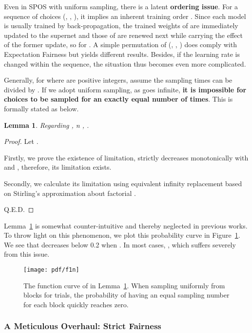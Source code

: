\documentclass[10pt,twocolumn,letterpaper]{article}
\newtheorem{lemma}[theorem]{Lemma}
\theoremstyle{definition}
\begin{document}
Even in SPOS \cite{guo2019single} with uniform sampling, there is a latent \textbf{ordering issue}. For a sequence of choices (, , ), it implies an inherent training order . Since each model is usually trained by back-propagation,
the trained weights of  are immediately updated to the supernet and those of  are renewed next while carrying the effect of the former update, so for . A simple permutation of (, , ) does comply with Expectation Fairness but yields different results. Besides, if the learning rate  is changed within the sequence, the situation thus becomes even more complicated. 

Generally, for  where  are positive integers,  
assume the sampling times  can be divided by . If we adopt uniform sampling, as  goes infinite, \textbf{it is impossible for  choices to be sampled for an exactly equal number of times}. This is formally stated as below.

\begin{lemma}
	\label{lem:m}
	Regarding ,  n  , .
\end{lemma}
\begin{proof}
Let .

	
	Firstly, we prove the existence of limitation,  strictly decreases monotonically with  and , therefore, its limitation exists. 
	
	Secondly, we calculate its limitation using equivalent infinity replacement based on Stirling's approximation about factorial \cite{tweddle2012james}.
	
	Q.E.D.
\end{proof}




Lemma~\ref{lem:m} is somewhat counter-intuitive and thereby neglected in previous works. To throw light on this phenomenon, we plot this probability curve in Figure~\ref{fig:f1n}. We see that  decreases below 0.2 when .  In most cases, , which suffers severely from this issue.

\begin{figure}[ht]
\centering
	\texttt{[image: pdf/f1n]}\\
\caption{The function curve of  in Lemma~\ref{lem:m}. When sampling uniformly from  blocks for  trials, the probability of having an equal sampling number for each block quickly reaches zero. }
	\label{fig:f1n}
\end{figure}
  




\subsubsection{A Meticulous Overhaul: Strict Fairness}
\end{document}

